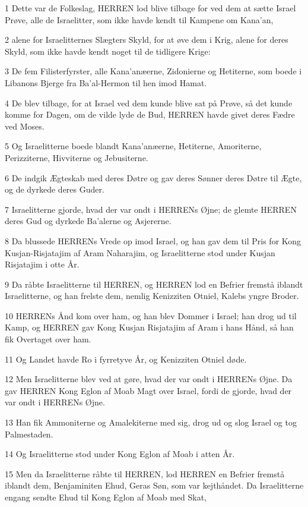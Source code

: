 \par 1 Dette var de Folkeslag, HERREN lod blive tilbage for ved dem at sætte Israel Prøve, alle de Israelitter, som ikke havde kendt til Kampene om Kana'an,
\par 2 alene for Israelitternes Slægters Skyld, for at øve dem i Krig, alene for deres Skyld, som ikke havde kendt noget til de tidligere Krige:
\par 3 De fem Filisterfyrster, alle Kana'anæerne, Zidonierne og Hetiterne, som boede i Libanons Bjerge fra Ba'al-Hermon til hen imod Hamat.
\par 4 De blev tilbage, for at Israel ved dem kunde blive sat på Prøve, så det kunde komme for Dagen, om de vilde lyde de Bud, HERREN havde givet deres Fædre ved Moses.
\par 5 Og Israelitterne boede blandt Kana'anæerne, Hetiterne, Amoriterne, Perizziterne, Hivviterne og Jebusiterne.
\par 6 De indgik Ægteskab med deres Døtre og gav deres Sønner deres Døtre til Ægte, og de dyrkede deres Guder.
\par 7 Israelitterne gjorde, hvad der var ondt i HERRENs Øjne; de glemte HERREN deres Gud og dyrkede Ba'alerne og Asjererne.
\par 8 Da blussede HERRENs Vrede op imod Israel, og han gav dem til Pris for Kong Kusjan-Risjatajim af Aram Naharajim, og Israelitterne stod under Kusjan Risjatajim i otte År.
\par 9 Da råbte Israelitterne til HERREN, og HERREN lod en Befrier fremstå iblandt Israelitterne, og han frelste dem, nemlig Kenizziten Otniel, Kalebs yngre Broder.
\par 10 HERRENs Ånd kom over ham, og han blev Dommer i Israel; han drog ud til Kamp, og HERREN gav Kong Kusjan Risjatajim af Aram i hans Hånd, så han fik Overtaget over ham.
\par 11 Og Landet havde Ro i fyrretyve År, og Kenizziten Otniel døde.
\par 12 Men Israelitterne blev ved at gøre, hvad der var ondt i HERRENs Øjne. Da gav HERREN Kong Eglon af Moab Magt over Israel, fordi de gjorde, hvad der var ondt i HERRENs Øjne.
\par 13 Han fik Ammoniterne og Amalekiterne med sig, drog ud og slog Israel og tog Palmestaden.
\par 14 Og Israelitterne stod under Kong Eglon af Moab i atten År.
\par 15 Men da Israelitterne råbte til HERREN, lod HERREN en Befrier fremstå iblandt dem, Benjaminiten Ehud, Geras Søn, som var kejthåndet. Da Israelitterne engang sendte Ehud til Kong Eglon af Moab med Skat,
